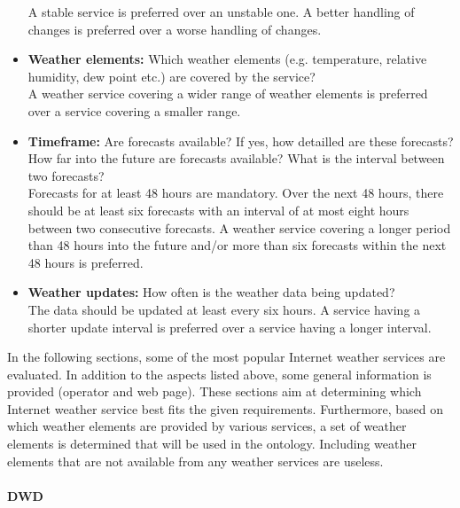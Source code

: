 \begin{itemize}
  A stable service is preferred over an unstable one. A better handling of changes is preferred over a worse handling of changes.
  \item \textbf{Weather elements:} Which weather elements (e.g. temperature, relative humidity, dew point etc.) are covered by the service?\\
  A weather service covering a wider range of weather elements is preferred over a service covering a smaller range.
  \item \textbf{Timeframe:} Are forecasts available? If yes, how detailled are these forecasts? How far into the future are forecasts available? What is the interval between two forecasts?\\
  Forecasts for at least 48 hours are mandatory. Over the next 48 hours, there should be at least six forecasts with an interval of at most eight hours between two consecutive forecasts. A weather service covering a longer period than 48 hours into the future and/or more than six forecasts within the next 48 hours is preferred.
  \item \textbf{Weather updates:} How often is the weather data being updated?\\
  The data should be updated at least every six hours. A service having a shorter update interval is preferred over a service having a longer interval.
\end{itemize}

In the following sections, some of the most popular Internet weather services are evaluated. In addition to the aspects listed above, some general information is provided (operator and web page). These sections aim at determining which Internet weather service best fits the given requirements. Furthermore, based on which weather elements are provided by various services, a set of weather elements is determined that will be used in the ontology. Including weather elements that are not available from any weather services are useless.


\paragraph{DWD}

